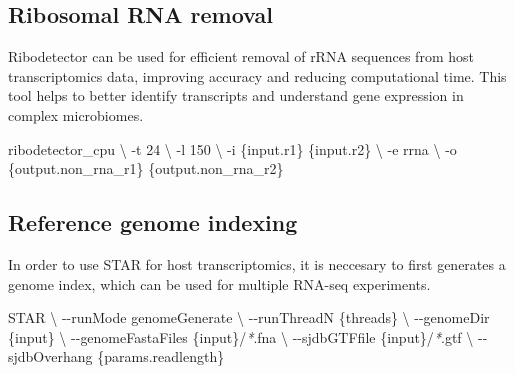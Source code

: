 \documentclass[
]{book}
\newenvironment{Shaded}{\begin{snugshade}}{\end{snugshade}}
\newcommand{\AttributeTok}[1]{\textcolor[rgb]{0.77,0.63,0.00}{#1}}
\newcommand{\DataTypeTok}[1]{\textcolor[rgb]{0.13,0.29,0.53}{#1}}
\newcommand{\ExtensionTok}[1]{#1}
\newcommand{\NormalTok}[1]{#1}
\newcommand{\PreprocessorTok}[1]{\textcolor[rgb]{0.56,0.35,0.01}{\textit{#1}}}
\begin{document}
\normalsize

\hypertarget{ribosomal-rna-removal}{%
\subsection*{Ribosomal RNA removal}\label{ribosomal-rna-removal}}

Ribodetector can be used for efficient removal of rRNA sequences from host transcriptomics data, improving accuracy and reducing computational time. This tool helps to better identify transcripts and understand gene expression in complex microbiomes.

\small

\begin{Shaded}
\begin{Highlighting}[]
\ExtensionTok{ribodetector\_cpu} \DataTypeTok{\textbackslash{}}
      \AttributeTok{{-}t}\NormalTok{ 24 }\DataTypeTok{\textbackslash{}}
      \AttributeTok{{-}l}\NormalTok{ 150 }\DataTypeTok{\textbackslash{}}
      \AttributeTok{{-}i}\NormalTok{ \{input.r1\} \{input.r2\} }\DataTypeTok{\textbackslash{}}
      \AttributeTok{{-}e}\NormalTok{ rrna }\DataTypeTok{\textbackslash{}}
      \AttributeTok{{-}o}\NormalTok{ \{output.non\_rna\_r1\} \{output.non\_rna\_r2\}}
\end{Highlighting}
\end{Shaded}

\normalsize

\hypertarget{reference-genome-indexing}{%
\subsection*{Reference genome indexing}\label{reference-genome-indexing}}

In order to use STAR for host transcriptomics, it is neccesary to first generates a genome index, which can be used for multiple RNA-seq experiments.

\small

\begin{Shaded}
\begin{Highlighting}[]
\ExtensionTok{STAR} \DataTypeTok{\textbackslash{}}
      \AttributeTok{{-}{-}runMode}\NormalTok{ genomeGenerate }\DataTypeTok{\textbackslash{}}
      \AttributeTok{{-}{-}runThreadN}\NormalTok{ \{threads\} }\DataTypeTok{\textbackslash{}}
      \AttributeTok{{-}{-}genomeDir}\NormalTok{ \{input\} }\DataTypeTok{\textbackslash{}}
      \AttributeTok{{-}{-}genomeFastaFiles}\NormalTok{ \{input\}/}\PreprocessorTok{*}\NormalTok{.fna }\DataTypeTok{\textbackslash{}}
      \AttributeTok{{-}{-}sjdbGTFfile}\NormalTok{ \{input\}/}\PreprocessorTok{*}\NormalTok{.gtf }\DataTypeTok{\textbackslash{}}
      \AttributeTok{{-}{-}sjdbOverhang}\NormalTok{ \{params.readlength\}}
\end{Highlighting}
\end{Shaded}
\end{document}
